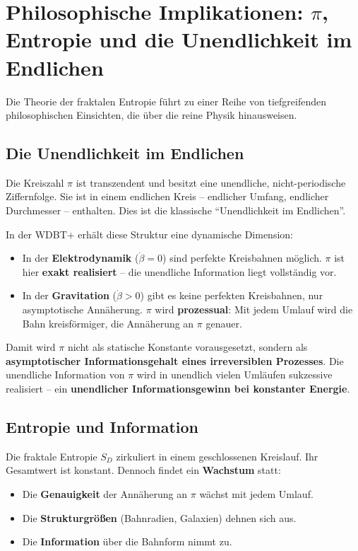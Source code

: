 \documentclass[12pt,a4paper]{article}
\begin{document}
\section{Philosophische Implikationen: $\pi$, Entropie und die Unendlichkeit im Endlichen}

Die Theorie der fraktalen Entropie führt zu einer Reihe von tiefgreifenden philosophischen Einsichten, die über die reine Physik hinausweisen.

\subsection{Die Unendlichkeit im Endlichen}

Die Kreiszahl $\pi$ ist transzendent und besitzt eine unendliche, nicht-periodische Ziffernfolge. Sie ist in einem endlichen Kreis – endlicher Umfang, endlicher Durchmesser – enthalten. Dies ist die klassische \enquote{Unendlichkeit im Endlichen}.

In der WDBT+ erhält diese Struktur eine dynamische Dimension:

\begin{itemize}
    \item In der \textbf{Elektrodynamik} ($\dot{\beta}=0$) sind perfekte Kreisbahnen möglich. $\pi$ ist hier \textbf{exakt realisiert} – die unendliche Information liegt vollständig vor.
    \item In der \textbf{Gravitation} ($\dot{\beta}>0$) gibt es keine perfekten Kreisbahnen, nur asymptotische Annäherung. $\pi$ wird \textbf{prozessual}: Mit jedem Umlauf wird die Bahn kreisförmiger, die Annäherung an $\pi$ genauer.
\end{itemize}

Damit wird $\pi$ nicht als statische Konstante vorausgesetzt, sondern als \textbf{asymptotischer Informationsgehalt eines irreversiblen Prozesses}. Die unendliche Information von $\pi$ wird in unendlich vielen Umläufen sukzessive realisiert – ein \textbf{unendlicher Informationsgewinn bei konstanter Energie}.

\subsection{Entropie und Information}

Die fraktale Entropie $S_D$ zirkuliert in einem geschlossenen Kreislauf. Ihr Gesamtwert ist konstant. Dennoch findet ein \textbf{Wachstum} statt:

\begin{itemize}
    \item Die \textbf{Genauigkeit} der Annäherung an $\pi$ wächst mit jedem Umlauf.
    \item Die \textbf{Strukturgrößen} (Bahnradien, Galaxien) dehnen sich aus.
    \item Die \textbf{Information} über die Bahnform nimmt zu.
\end{itemize}
\end{document}
